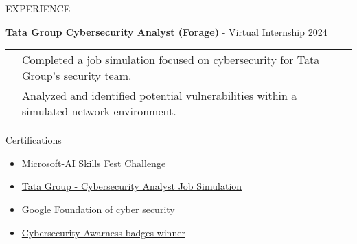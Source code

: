 \documentclass{resume}
\begin{document}
\begin{rSection}{EXPERIENCE}
    \begin{itemize}
        {\bf Tata Group Cybersecurity Analyst (Forage)} - Virtual Internship \hfill {2024}\\
        \begin{tabular}{>{\bfseries}l l}
            \textbf{} & Completed a job simulation focused on cybersecurity for Tata Group's security team. \\
            & Analyzed and identified potential vulnerabilities within a simulated network environment. \\
        \end{tabular}
    \end{itemize}
    
\end{rSection}

\vspace{1em}
\begin{rSection}{Certifications}
    \begin{itemize}
        \item \href{https://learn.microsoft.com/en-gb/users/trishamandal-9657/achievements}{ Microsoft-AI Skills Fest Challenge}
        \item \href{https://forage-uploads-prod.s3.amazonaws.com/completion-certificates/ifobHAoMjQs9s6bKS/gmf3ypEXBj2wvfQWC_ifobHAoMjQs9s6bKS_6Nb4sGDuznzcHyCSu_1732378719946_completion_certificate.pdf}{Tata Group - Cybersecurity Analyst Job Simulation}
        \item \href{https://coursera.org/share/dc5df20e6dc55a6b8b97cd5bc2d5d927}{Google Foundation of cyber security}
        \item \href{https://app.kajabi.com/certificates/1d00b4fe}{Cybersecurity Awarness badges winner}
    \end{itemize}
    \vspace{1em}
\end{rSection}
\end{document}
